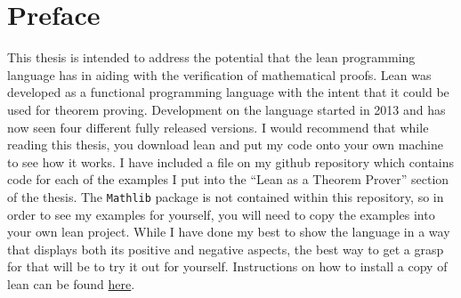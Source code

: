 \documentclass[
  letterpaper,
]{scrreprt}
\renewcommand*\contentsname{Table of contents}
\newcommand\contentsname{Table of contents}
\theoremstyle{remark}
\begin{document}
\newenvironment{nthm}[1]
  {\renewcommand{\thmnm}{#1}\begin{namedthm}}
  {\end{namedthm}}

\newenvironment{ndfn}[1]
  {\renewcommand{\defnm}{#1}\begin{nameddfn}}
  {\end{nameddfn}}

\newenvironment{npf}[1]
  {\begin{proof}[#1]}
  {\end{proof}}


\let\oldgreater\textgreater
\renewcommand{\textgreater}{\null\oldgreater}   %

\ifdefined\Shaded\renewenvironment{Shaded}{\begin{tcolorbox}[sharp corners, breakable, enhanced, boxrule=0pt, borderline west={3pt}{0pt}{shadecolor}, frame hidden, interior hidden]}{\end{tcolorbox}}\fi

\renewcommand*\contentsname{Table of contents}
{
\hypersetup{linkcolor=}
\setcounter{tocdepth}{1}
\tableofcontents
}

\hypertarget{preface}{%
\chapter*{Preface}\label{preface}}



This thesis is intended to address the potential that the lean
programming language has in aiding with the verification of mathematical
proofs. Lean was developed as a functional programming language with the
intent that it could be used for theorem proving. Development on the
language started in 2013 and has now seen four different fully released
versions. I would recommend that while reading this thesis, you download
lean and put my code onto your own machine to see how it works. I have
included a file on my github repository which contains code for each of
the examples I put into the ``Lean as a Theorem Prover'' section of the
thesis. The \texttt{Mathlib} package is not contained within this
repository, so in order to see my examples for yourself, you will need
to copy the examples into your own lean project. While I have done my
best to show the language in a way that displays both its positive and
negative aspects, the best way to get a grasp for that will be to try it
out for yourself. Instructions on how to install a copy of lean can be
found \href{https://lean-lang.org/lean4/doc/quickstart.html}{here}.
\end{document}
